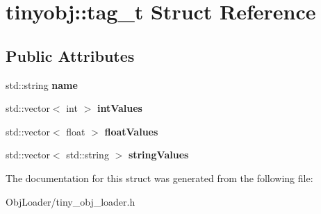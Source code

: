 \hypertarget{structtinyobj_1_1tag__t}{}\section{tinyobj\+:\+:tag\+\_\+t Struct Reference}
\label{structtinyobj_1_1tag__t}
\subsection*{Public Attributes}
\begin{DoxyCompactItemize}
\item 
\mbox{\label{structtinyobj_1_1tag__t_a9b3650154d2fbd83dad945ebcf6bd448}} 
std\+::string {\bfseries name}
\item 
\mbox{\label{structtinyobj_1_1tag__t_adc6a6682263abaa11e3ec62b910bb80d}} 
std\+::vector$<$ int $>$ {\bfseries int\+Values}
\item 
\mbox{\label{structtinyobj_1_1tag__t_a0e171be79978f9ef6de6abb33d1d4dc5}} 
std\+::vector$<$ float $>$ {\bfseries float\+Values}
\item 
\mbox{\label{structtinyobj_1_1tag__t_a25634eea923961fd5b2520ea782397e8}} 
std\+::vector$<$ std\+::string $>$ {\bfseries string\+Values}
\end{DoxyCompactItemize}


The documentation for this struct was generated from the following file\+:\begin{DoxyCompactItemize}
\item 
Obj\+Loader/tiny\+\_\+obj\+\_\+loader.\+h\end{DoxyCompactItemize}
